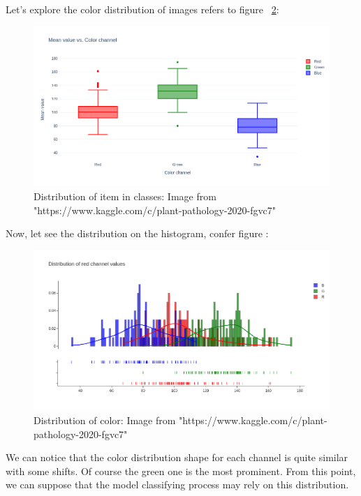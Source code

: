 \documentclass[a4paper]{article}
\begin{document}
Let's explore the color distribution of images refers to figure ~\ref{fig:boxplot}:
 
    \begin{figure}[H]
      \includegraphics[width=\linewidth]{images/boxplot.png}
      \caption{Distribution of item in classes: Image from  "https://www.kaggle.com/c/plant-pathology-2020-fgvc7"}
      \label{fig:boxplot}
    \end{figure}

Now, let see the distribution on the histogram, confer figure :

  \begin{figure}[H]
      \includegraphics[width=\linewidth]{images/histo.png}
      \caption{Distribution of color: Image from "https://www.kaggle.com/c/plant-pathology-2020-fgvc7"}
      \label{fig:boxplot}
    \end{figure}

We can notice that the color distribution shape for each channel is quite similar with some shifts. Of course the green one is the most prominent. From this point, we can suppose that the model classifying process may rely on this distribution.
\end{document}
